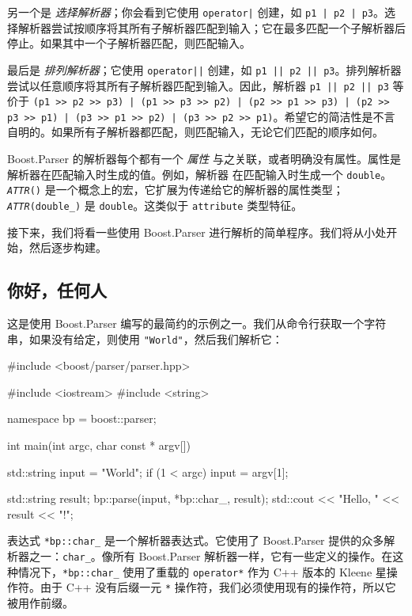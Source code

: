另一个是 \emph{选择解析器}；你会看到它使用 \texttt{operator|} 创建，如 \texttt{p1 | p2 | p3}。选择解析器尝试按顺序将其所有子解析器匹配到输入；它在最多匹配一个子解析器后停止。如果其中一个子解析器匹配，则匹配输入。

最后是 \emph{排列解析器}；它使用 \texttt{operator||} 创建，如 \texttt{p1 || p2 || p3}。排列解析器尝试以任意顺序将其所有子解析器匹配到输入。因此，解析器 \texttt{p1 || p2 || p3} 等价于 \texttt{(p1 >> p2 >> p3) | (p1 >> p3 >> p2) | (p2 >> p1 >> p3) | (p2 >> p3 >> p1) | (p3 >> p1 >> p2) | (p3 >> p2 >> p1)}。希望它的简洁性是不言自明的。如果所有子解析器都匹配，则匹配输入，无论它们匹配的顺序如何。

Boost.Parser 的解析器每个都有一个 \emph{属性} 与之关联，或者明确没有属性。属性是解析器在匹配输入时生成的值。例如，解析器  在匹配输入时生成一个 \texttt{double}。 \emph{\texttt{ATTR}}\texttt{()} 是一个概念上的宏，它扩展为传递给它的解析器的属性类型；\emph{\texttt{ATTR}}\texttt{(double\_)} 是 \texttt{double}。这类似于 \texttt{attribute} 类型特征。

接下来，我们将看一些使用 Boost.Parser 进行解析的简单程序。我们将从小处开始，然后逐步构建。

\subsection{你好，任何人}

这是使用 Boost.Parser 编写的最简约的示例之一。我们从命令行获取一个字符串，如果没有给定，则使用 \texttt{"World"}，然后我们解析它：

\begin{code}
#include <boost/parser/parser.hpp>

#include <iostream>
#include <string>


namespace bp = boost::parser;

int main(int argc, char const * argv[])
{
    std::string input = "World";
    if (1 < argc)
        input = argv[1];

    std::string result;
    bp::parse(input, *bp::char_, result);
    std::cout << "Hello, " << result << "!\n";
}
\end{code}

表达式 \texttt{*bp::char\_} 是一个解析器表达式。它使用了 Boost.Parser 提供的众多解析器之一：\texttt{char\_}。像所有 Boost.Parser 解析器一样，它有一些定义的操作。在这种情况下，\texttt{*bp::char\_} 使用了重载的 \texttt{operator*} 作为 C++ 版本的 Kleene 星操作符。由于 C++ 没有后缀一元 \texttt{*} 操作符，我们必须使用现有的操作符，所以它被用作前缀。

